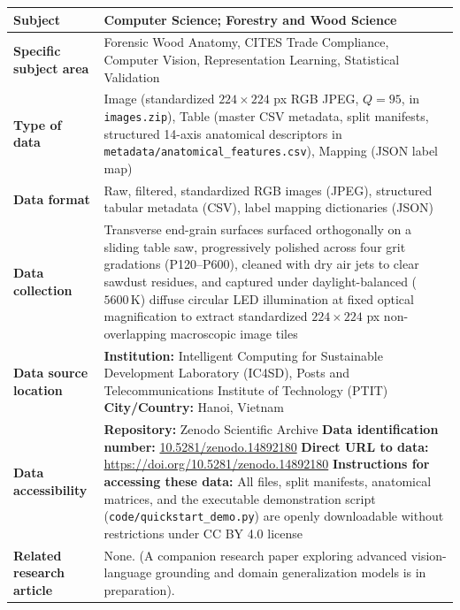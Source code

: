\documentclass[a4paper,fleqn,12pt]{cas-sc}
\begin{document}
\begin{tabularx}{\linewidth}{@{} l X @{}}
\toprule
\textbf{Subject} & Computer Science; Forestry and Wood Science \\
\midrule
\textbf{Specific subject area} & Forensic Wood Anatomy, CITES Trade Compliance, Computer Vision, Representation Learning, Statistical Validation \\
\midrule
\textbf{Type of data} & Image (standardized $224 \times 224$ px RGB JPEG, $Q=95$, in \texttt{images.zip}), Table (master CSV metadata, split manifests, structured 14-axis anatomical descriptors in \texttt{metadata/anatomical\_features.csv}), Mapping (JSON label map) \\
\midrule
\textbf{Data format} & Raw, filtered, standardized RGB images (JPEG), structured tabular metadata (CSV), label mapping dictionaries (JSON) \\
\midrule
\textbf{Data collection} & Transverse end-grain surfaces surfaced orthogonally on a sliding table saw, progressively polished across four grit gradations (P120--P600), cleaned with dry air jets to clear sawdust residues, and captured under daylight-balanced ($5600\,\text{K}$) diffuse circular LED illumination at fixed optical magnification to extract standardized $224 \times 224$ px non-overlapping macroscopic image tiles \\
\midrule
\textbf{Data source location} & \textbf{Institution:} Intelligent Computing for Sustainable Development Laboratory (IC4SD), Posts and Telecommunications Institute of Technology (PTIT) \newline
\textbf{City/Country:} Hanoi, Vietnam \\
\midrule
\textbf{Data accessibility} & \textbf{Repository:} Zenodo Scientific Archive \newline
\textbf{Data identification number:} \href{https://doi.org/10.5281/zenodo.14892180}{10.5281/zenodo.14892180} \newline
\textbf{Direct URL to data:} \url{https://doi.org/10.5281/zenodo.14892180} \newline
\textbf{Instructions for accessing these data:} All files, split manifests, anatomical matrices, and the executable demonstration script (\texttt{code/quickstart\_demo.py}) are openly downloadable without restrictions under CC BY 4.0 license \\
\midrule
\textbf{Related research article} & None. (A companion research paper exploring advanced vision-language grounding and domain generalization models is in preparation). \\
\bottomrule
\end{tabularx}
\end{document}
